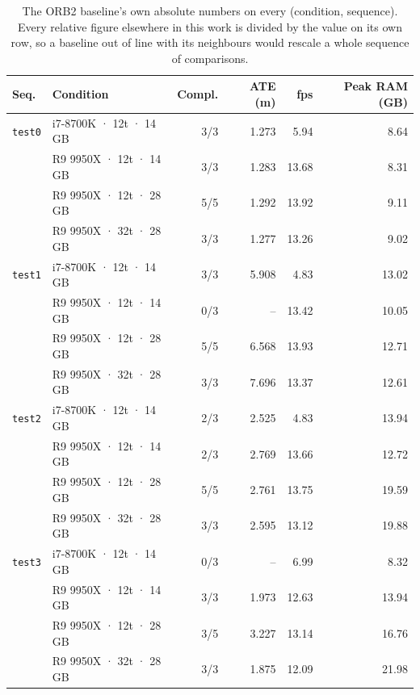 \begin{table}[htbp]
\centering
\caption{The ORB2 baseline's own absolute numbers on every (condition, sequence). Every relative figure elsewhere in this work is divided by the value on its own row, so a baseline out of line with its neighbours would rescale a whole sequence of comparisons.}
\label{tab:baseline-health}
\begin{tabular}{llrrrr}
\toprule
Seq. & Condition & Compl. & ATE (m) & fps & Peak RAM (GB) \\
\midrule
\texttt{test0} & i7-8700K · 12t · 14 GB & 3/3 & 1.273 & 5.94 & 8.64 \\
\texttt{} & R9 9950X · 12t · 14 GB & 3/3 & 1.283 & 13.68 & 8.31 \\
\texttt{} & R9 9950X · 12t · 28 GB & 5/5 & 1.292 & 13.92 & 9.11 \\
\texttt{} & R9 9950X · 32t · 28 GB & 3/3 & 1.277 & 13.26 & 9.02 \\
\texttt{test1} & i7-8700K · 12t · 14 GB & 3/3 & 5.908 & 4.83 & 13.02 \\
\texttt{} & R9 9950X · 12t · 14 GB & 0/3 & -- & 13.42 & 10.05 \\
\texttt{} & R9 9950X · 12t · 28 GB & 5/5 & 6.568 & 13.93 & 12.71 \\
\texttt{} & R9 9950X · 32t · 28 GB & 3/3 & 7.696 & 13.37 & 12.61 \\
\texttt{test2} & i7-8700K · 12t · 14 GB & 2/3 & 2.525 & 4.83 & 13.94 \\
\texttt{} & R9 9950X · 12t · 14 GB & 2/3 & 2.769 & 13.66 & 12.72 \\
\texttt{} & R9 9950X · 12t · 28 GB & 5/5 & 2.761 & 13.75 & 19.59 \\
\texttt{} & R9 9950X · 32t · 28 GB & 3/3 & 2.595 & 13.12 & 19.88 \\
\texttt{test3} & i7-8700K · 12t · 14 GB & 0/3 & -- & 6.99 & 8.32 \\
\texttt{} & R9 9950X · 12t · 14 GB & 3/3 & 1.973 & 12.63 & 13.94 \\
\texttt{} & R9 9950X · 12t · 28 GB & 3/5 & 3.227 & 13.14 & 16.76 \\
\texttt{} & R9 9950X · 32t · 28 GB & 3/3 & 1.875 & 12.09 & 21.98 \\
\bottomrule
\end{tabular}
\end{table}
